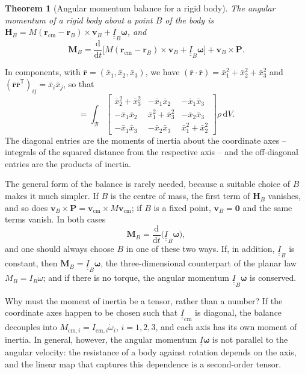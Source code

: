\documentclass[11pt,a4paper,oneside]{report}
\numberwithin{equation}{chapter}
\newcommand{\vect}[1]{\bm{#1}}
\newcommand{\tens}[1]{\underline{\underline{#1}}}
\newcommand{\dd}{\,\mathrm{d}}
\newcommand{\dv}[2]{\frac{\mathrm{d}#1}{\mathrm{d}#2}}
\newcommand{\cm}{\mathrm{cm}}
\theoremstyle{plain}
\newtheorem{theorem}{Theorem}[chapter]
\theoremstyle{definition}
\theoremstyle{remark}
\begin{document}
\begin{theorem}[Angular momentum balance for a rigid body]
The angular momentum of a rigid body about a point $B$ of the body is
$\vect H_B=M(\vect r_\cm-\vect r_B)\times\vect v_B+\tens I_B\vect\omega$, and
\begin{equation}
  \vect M_B=\dv{}{t}\Big[M(\vect r_\cm-\vect r_B)\times\vect v_B+\tens I_B\vect\omega\Big]+\vect v_B\times\vect P .
\end{equation}
\end{theorem}

In components, with $\bar{\vect r}=(\bar x_1,\bar x_2,\bar x_3)$, we have
$(\bar{\vect r}\cdot\bar{\vect r})=\bar x_1^2+\bar x_2^2+\bar x_3^2$ and $(\bar{\vect r}\bar{\vect r}^{\mathsf T})_{ij}=\bar x_i\bar x_j$,
so that
\begin{equation}
  [\tens I_B]=\int_{\mathcal B}\begin{bmatrix}
    \bar x_2^2+\bar x_3^2 & -\bar x_1\bar x_2 & -\bar x_1\bar x_3\\
    -\bar x_1\bar x_2 & \bar x_1^2+\bar x_3^2 & -\bar x_2\bar x_3\\
    -\bar x_1\bar x_3 & -\bar x_2\bar x_3 & \bar x_1^2+\bar x_2^2
  \end{bmatrix}\rho\dd V .
\end{equation}
The diagonal entries are the moments of inertia about the coordinate axes -- integrals of the squared distance from
the respective axis -- and the off-diagonal entries are the products of inertia.

The general form of the balance is rarely needed, because a suitable choice of $B$ makes it much simpler. If $B$ is the
centre of mass, the first term of $\vect H_B$ vanishes, and so does $\vect v_B\times\vect P=\vect v_\cm\times M\vect v_\cm$;
if $B$ is a fixed point, $\vect v_B=\vect 0$ and the same terms vanish. In both cases
\begin{equation}\label{eq:amb-simple}
  \vect M_B=\dv{}{t}\big(\tens I_B\vect\omega\big),
\end{equation}
and one should always choose $B$ in one of these two ways. If, in addition, $\tens I_B$ is constant, then
$\vect M_B=\tens I_B\dot{\vect\omega}$, the three-dimensional counterpart of the planar law $M_B=I_B\dot\omega$; and if
there is no torque, the angular momentum $\tens I_B\vect\omega$ is conserved.

Why must the moment of inertia be a tensor, rather than a number? If the coordinate axes happen to be chosen such that
$\tens I_\cm$ is diagonal, the balance decouples into $M_{\cm,i}=I_{\cm,i}\dot\omega_i$, $i=1,2,3$, and each axis
has its own moment of inertia. In general, however, the angular momentum $\tens I\vect\omega$ is not parallel to the
angular velocity: the resistance of a body against rotation depends on the axis, and the linear map that captures this
dependence is a second-order tensor.
\end{document}
